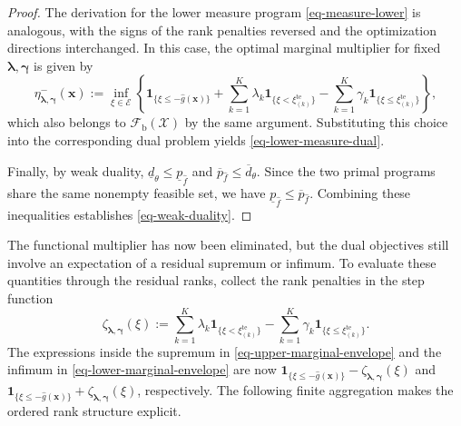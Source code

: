 \documentclass[review,11pt,3p,authoryear,nopreprintline]{elsarticle}
\begin{document}
\begin{proof}
  The derivation for the lower measure program \eqref{eq-measure-lower} is analogous, with the signs of the rank penalties reversed and the optimization directions interchanged. In this case, the optimal marginal multiplier for fixed $\bm\lambda,\bm\gamma$ is given by
  \begin{equation}
    \eta^-_{\bm\lambda,\bm\gamma}(\bm x)
    :=\inf_{\xi\in\mathcal E}\left\{
      \mathbf1_{\{\xi\le-\hat g(\bm x)\}}
      +\sum_{k=1}^K\lambda_k\mathbf1_{\{\xi<\xi_{(k)}^{\mathrm{te}}\}}
      -\sum_{k=1}^K\gamma_k\mathbf1_{\{\xi\le\xi_{(k)}^{\mathrm{te}}\}}
    \right\},
    \label{eq-lower-marginal-envelope}
  \end{equation}
  which also belongs to $\mathcal F_{\mathrm b}(\mathcal X)$ by the same argument. Substituting this choice into the corresponding dual problem yields \eqref{eq-lower-measure-dual}.

  Finally, by weak duality, $\underline d_\theta\le\underline p_{\hat f}$ and $\overline p_{\hat f}\le\overline d_\theta$. Since the two primal programs share the same nonempty feasible set, we have $\underline p_{\hat f}\le\overline p_{\hat f}$. Combining these inequalities establishes \eqref{eq-weak-duality}.
\end{proof}

The functional multiplier has now been eliminated, but the dual objectives still involve an expectation of a residual supremum or infimum. To evaluate these quantities through the residual ranks, collect the rank penalties in the step function
\begin{equation}
  \zeta_{\bm\lambda,\bm\gamma}(\xi)
  :=\sum_{k=1}^K\lambda_k\mathbf1_{\{\xi<\xi_{(k)}^{\mathrm{te}}\}}
    -\sum_{k=1}^K\gamma_k\mathbf1_{\{\xi\le\xi_{(k)}^{\mathrm{te}}\}}.
  \label{eq-dual-step-function}
\end{equation}
The expressions inside the supremum in \eqref{eq-upper-marginal-envelope} and the infimum in \eqref{eq-lower-marginal-envelope} are now $\mathbf1_{\{\xi\le-\hat g(\bm x)\}}-\zeta_{\bm\lambda,\bm\gamma}(\xi)$ and $\mathbf1_{\{\xi\le-\hat g(\bm x)\}}+\zeta_{\bm\lambda,\bm\gamma}(\xi)$, respectively. The following finite aggregation makes the ordered rank structure explicit.
\end{document}
